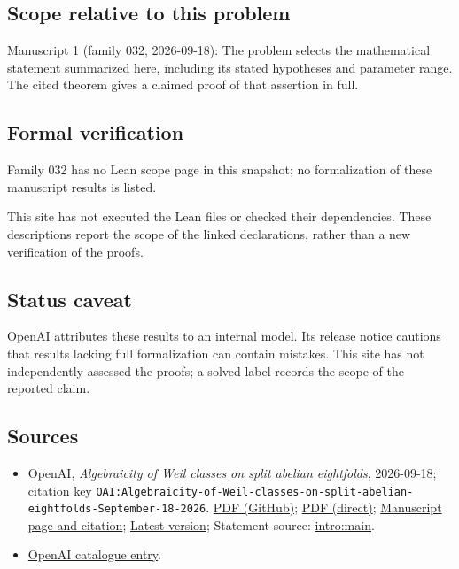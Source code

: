 \documentclass[11pt]{article}
\begin{document}
\subsection{Scope relative to this problem}
Manuscript 1 (family 032, 2026-09-18): The problem selects the mathematical statement summarized here, including its stated hypotheses and parameter range. The cited theorem gives a claimed proof of that assertion in full.

\subsection{Formal verification}
Family 032 has no Lean scope page in this snapshot; no formalization of these manuscript results is listed.

This site has not executed the Lean files or checked their dependencies. These descriptions report the scope of the linked declarations, rather than a new verification of the proofs.

\subsection{Status caveat}
OpenAI attributes these results to an internal model. Its release notice cautions that results lacking full formalization can contain mistakes. This site has not independently assessed the proofs; a solved label records the scope of the reported claim.

\subsection{Sources}
\begin{itemize}
\item OpenAI, \emph{Algebraicity of Weil classes on split abelian eightfolds}, 2026-09-18; citation key \texttt{OAI:Algebraicity-of-Weil-classes-on-split-abelian-eightfolds-September-18-2026}. \href{https://github.com/openai/math/blob/adc7f1241b42e322a6451854ab7e4b4c146bf78a/preprints/Algebraicity-of-Weil-classes-on-split-abelian-eightfolds-September-18-2026/paper.pdf}{PDF (GitHub)}; \href{https://github.com/openai/math/raw/adc7f1241b42e322a6451854ab7e4b4c146bf78a/preprints/Algebraicity-of-Weil-classes-on-split-abelian-eightfolds-September-18-2026/paper.pdf}{PDF (direct)}; \href{https://github.com/openai/math/blob/adc7f1241b42e322a6451854ab7e4b4c146bf78a/preprints/Algebraicity-of-Weil-classes-on-split-abelian-eightfolds-September-18-2026/README.md}{Manuscript page and citation}; \href{https://github.com/openai/math/blob/main/preprints/Algebraicity-of-Weil-classes-on-split-abelian-eightfolds-September-18-2026/paper.pdf}{Latest version}; Statement source: \href{https://github.com/openai/math/blob/adc7f1241b42e322a6451854ab7e4b4c146bf78a/preprints/Algebraicity-of-Weil-classes-on-split-abelian-eightfolds-September-18-2026/build/sections/01-introduction.tex\#L51}{intro:main}.
\item \href{https://github.com/openai/math/blob/adc7f1241b42e322a6451854ab7e4b4c146bf78a/CONTENTS.md}{OpenAI catalogue entry}.
\end{itemize}
\end{document}
